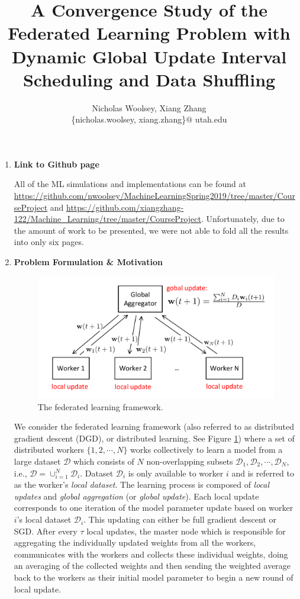 \documentclass[11pt, fullpage,letterpaper]{article}
\title{A Convergence Study of the Federated Learning Problem with Dynamic Global Update Interval Scheduling and Data Shuffling}
\author{Nicholas Woolsey, Xiang Zhang\\ \{nicholas.woolsey, xiang.zhang\}$@$ utah.edu}
\newcommand{\tbf}{\textbf}
\begin{document}
\maketitle
\begin{enumerate}
\item \tbf{Link to Github page}

All of the ML simulations and implementations can be found at \\ \url{https://github.com/nwoolsey/MachineLearningSpring2019/tree/master/CourseProject} and \url{https://github.com/xiangzhang-122/Machine_Learning/tree/master/CourseProject}. Unfortunately, due to the amount of work to be presented, we were not able to fold all the results into only six pages.

\item \tbf{Problem Formulation \& Motivation}\\
\begin{figure}
  \centering
  \includegraphics[width=0.6\linewidth]{sys_architecture}
\caption{The federated learning framework.}
\label{fig_archt}
\end{figure}
We consider the federated learning framework (also referred to as distributed gradient descent (DGD), or distributed learning. See Figure \ref{fig_archt}) where a set of distributed workers $\{1,2,\cdots, N\}$ works collectively to learn a model from a large dataset $\mathcal{D}$ which consists of $N$ non-overlapping subsets $\mathcal{D}_1, \mathcal{D}_2, \cdots, \mathcal{D}_N$, i.e., $\mathcal{D} = \cup_{i=1}^N\mathcal{D}_i$. Dataset $\mathcal{D}_i$ is only available to worker $i$ and is referred to as the worker's \emph{local dataset}. The learning process is composed of \emph{local updates} and \emph{global aggregation} (or \emph{global update}). Each local update corresponds to one iteration of the model parameter update based on worker $i$'s local dataset $\mathcal{D}_i$. This updating can either be full gradient descent or SGD. After every $\tau$ local updates, the master node which is responsible for aggregating the individually updated weights from all the workers, communicates with the workers and collects these individual weights, doing an averaging of the collected weights \cite{ref4} and then sending the weighted average back to the workers as their initial model parameter to begin a new round of local update.


\end{enumerate}
\end{document}
